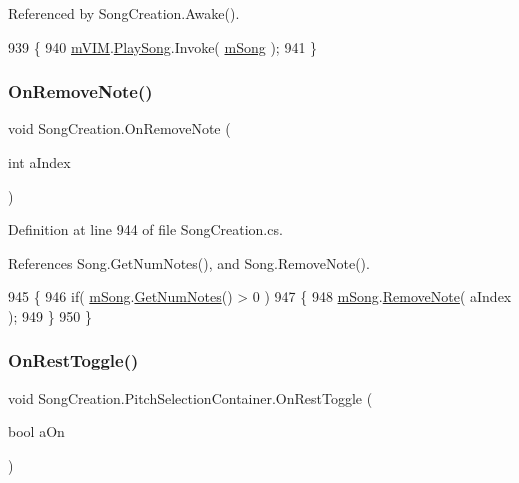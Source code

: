 Referenced by Song\+Creation.\+Awake().


\begin{DoxyCode}
939     \{
940         \hyperlink{group___s_c_priv_var_ga1bad472098eec4194c5b18e7b3ccfd94}{mVIM}.\hyperlink{group___v_i_m_events_gae450bdba9c513ab4e43f69def50fa84d}{PlaySong}.Invoke( \hyperlink{group___s_c_priv_var_ga9554e9b3758d1cc1e841a5f7d8aa9f56}{mSong} );
941     \}
\end{DoxyCode}
\mbox{\label{group___s_c_handlers_ga485d615c895cddde720b719b64ab4245}} 
\subsubsection{\texorpdfstring{On\+Remove\+Note()}{OnRemoveNote()}}
{\footnotesize\ttfamily void Song\+Creation.\+On\+Remove\+Note (\begin{DoxyParamCaption}\item[{int}]{a\+Index }\end{DoxyParamCaption})}



Definition at line 944 of file Song\+Creation.\+cs.



References Song.\+Get\+Num\+Notes(), and Song.\+Remove\+Note().


\begin{DoxyCode}
945     \{
946         \textcolor{keywordflow}{if}( \hyperlink{group___s_c_priv_var_ga9554e9b3758d1cc1e841a5f7d8aa9f56}{mSong}.\hyperlink{group___song_const_gad124d0af146885327f8ac455bc013b63}{GetNumNotes}() > 0 )
947         \{
948             \hyperlink{group___s_c_priv_var_ga9554e9b3758d1cc1e841a5f7d8aa9f56}{mSong}.\hyperlink{group___song_const_ga856634e047b8c35160958c3aa53d6b28}{RemoveNote}( aIndex );
949         \}
950     \}
\end{DoxyCode}
\mbox{\label{group___s_c_handlers_ga6099b691cc9af45777cfc76f3f681efe}} 
\subsubsection{\texorpdfstring{On\+Rest\+Toggle()}{OnRestToggle()}}
{\footnotesize\ttfamily void Song\+Creation.\+Pitch\+Selection\+Container.\+On\+Rest\+Toggle (\begin{DoxyParamCaption}\item[{bool}]{a\+On }\end{DoxyParamCaption})}



